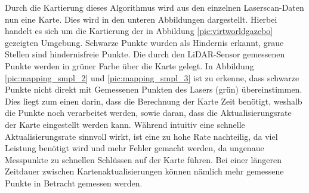 {{		Durch die Kartierung dieses Algorithmus wird aus den einzelnen Laserscan-Daten nun eine Karte. Dies wird in den unteren Abbildungen dargestellt. Hierbei handelt es sich um die Kartierung der in Abbildung \ref{pic:virtworldgazebo} gezeigten Umgebung. Schwarze Punkte wurden als Hindernis erkannt, graue Stellen sind hindernisfreie Punkte. Die durch den LiDAR-Sensor gemessenen Punkte werden in grüner Farbe über die Karte gelegt. In Abbildung \ref{pic:mapping_smpl_2} und \ref{pic:mapping_smpl_3} ist zu erkenne, dass schwarze Punkte nicht direkt mit Gemessenen Punkten des Lasers (grün) übereinstimmen. Dies liegt zum einen darin, dass die Berechnung der Karte Zeit benötigt, weshalb die Punkte noch verarbeitet werden, sowie daran, dass die Aktualisierungsrate der Karte eingestellt werden kann. Während intuitiv eine schnelle Aktualisierungsrate sinnvoll wirkt, ist eine zu hohe Rate nachteilig, da viel Leistung benötigt wird und mehr Fehler gemacht werden, da ungenaue Messpunkte zu schnellen Schlüssen auf der Karte führen. Bei einer längeren Zeitdauer zwischen Kartenaktualisierungen können nämlich mehr gemessene Punkte in Betracht gemessen werden.
		
}}
